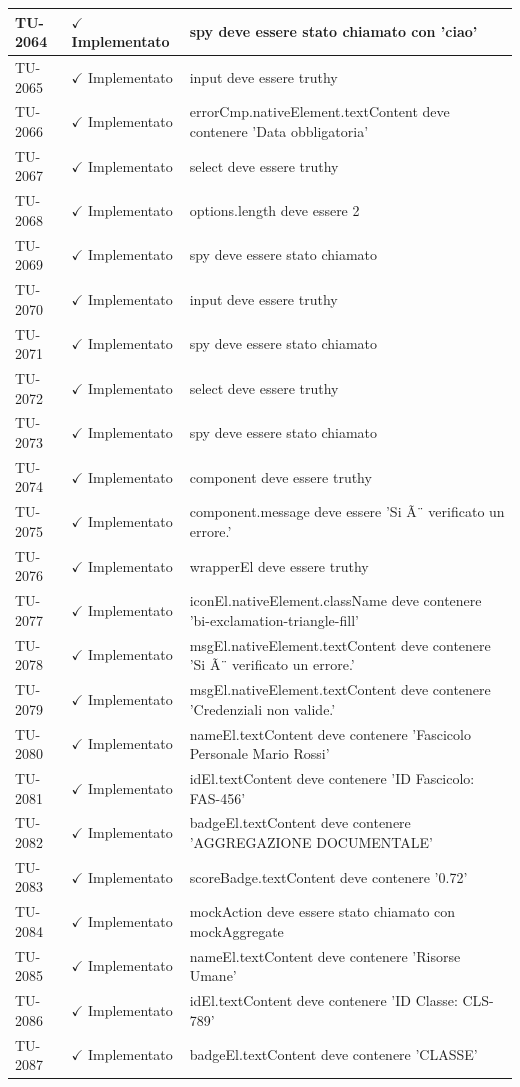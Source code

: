 ﻿\documentclass[a4paper,12pt]{article}
\newcommand{\ok}{\textcolor{green!60!black}{$\checkmark$ Implementato}}
\begin{document}
\begin{longtable}{|p{2cm}|p{3.5cm}|p{9.5cm}|}
\hline
TU-2064 & \ok & spy deve essere stato chiamato con 'ciao' \\
\hline
TU-2065 & \ok & input deve essere truthy \\
\hline
TU-2066 & \ok & errorCmp.nativeElement.textContent deve contenere 'Data obbligatoria' \\
\hline
TU-2067 & \ok & select deve essere truthy \\
\hline
TU-2068 & \ok & options.length deve essere 2 \\
\hline
TU-2069 & \ok & spy deve essere stato chiamato \\
\hline
TU-2070 & \ok & input deve essere truthy \\
\hline
TU-2071 & \ok & spy deve essere stato chiamato \\
\hline
TU-2072 & \ok & select deve essere truthy \\
\hline
TU-2073 & \ok & spy deve essere stato chiamato \\
\hline
TU-2074 & \ok & component deve essere truthy \\
\hline
TU-2075 & \ok & component.message deve essere 'Si Ã¨ verificato un errore.' \\
\hline
TU-2076 & \ok & wrapperEl deve essere truthy \\
\hline
TU-2077 & \ok & iconEl.nativeElement.className deve contenere 'bi-exclamation-triangle-fill' \\
\hline
TU-2078 & \ok & msgEl.nativeElement.textContent deve contenere 'Si Ã¨ verificato un errore.' \\
\hline
TU-2079 & \ok & msgEl.nativeElement.textContent deve contenere 'Credenziali non valide.' \\
\hline
TU-2080 & \ok & nameEl.textContent deve contenere 'Fascicolo Personale Mario Rossi' \\
\hline
TU-2081 & \ok & idEl.textContent deve contenere 'ID Fascicolo: FAS-456' \\
\hline
TU-2082 & \ok & badgeEl.textContent deve contenere 'AGGREGAZIONE DOCUMENTALE' \\
\hline
TU-2083 & \ok & scoreBadge.textContent deve contenere '0.72' \\
\hline
TU-2084 & \ok & mockAction deve essere stato chiamato con mockAggregate \\
\hline
TU-2085 & \ok & nameEl.textContent deve contenere 'Risorse Umane' \\
\hline
TU-2086 & \ok & idEl.textContent deve contenere 'ID Classe: CLS-789' \\
\hline
TU-2087 & \ok & badgeEl.textContent deve contenere 'CLASSE' \\

\end{longtable}
\end{document}
